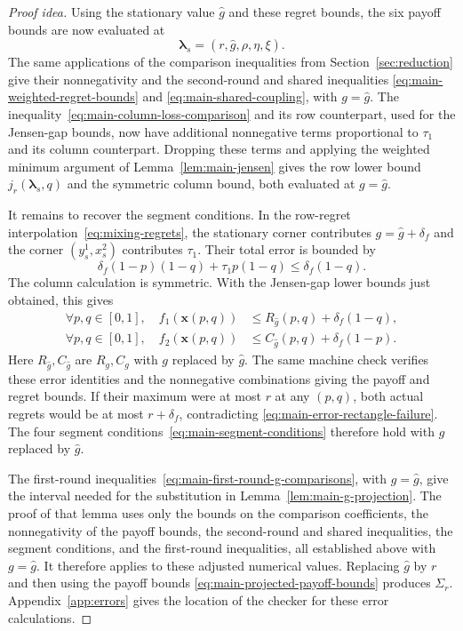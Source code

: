 \documentclass[11pt]{article}
\theoremstyle{remark}
\theoremstyle{plain}
\begin{document}
\begin{proof}[Proof idea]
Using the stationary value $\hat g$ and these regret bounds, the six
payoff bounds are now evaluated at
\begin{equation}
 \boldsymbol\lambda_s=(r,\hat g,\rho,\eta,\xi).
 \label{eq:main-error-payoff-parameters}
\end{equation}
The same applications of the comparison inequalities from
Section~\ref{sec:reduction}
give their nonnegativity and the second-round and shared inequalities
\eqref{eq:main-weighted-regret-bounds} and
\eqref{eq:main-shared-coupling}, with $g=\hat g$.
The inequality~\eqref{eq:main-column-loss-comparison} and its row
counterpart, used for the Jensen-gap bounds, now have
additional nonnegative terms proportional to $\tau_1$ and its
column counterpart. Dropping these terms and applying the weighted
minimum argument of Lemma~\ref{lem:main-jensen} gives the row
lower bound $j_r(\boldsymbol\lambda_s,q)$ and the symmetric
column bound, both evaluated at $g=\hat g$.

It remains to recover the segment conditions. In the row-regret
interpolation~\eqref{eq:mixing-regrets}, the stationary corner
contributes $g=\hat g+\delta_f$ and the corner $(y_s^1,x_s^2)$
contributes $\tau_1$. Their total error is bounded by
\[
 \delta_f(1-p)(1-q)+\tau_1p(1-q)
 \le\delta_f(1-q).
\]
The column calculation is symmetric. With the Jensen-gap lower
bounds just obtained, this gives
\begin{equation}
 \begin{aligned}
 \forall p,q\in[0,1],\quad f_1(\boldsymbol x(p,q))
   &\le R_{\hat g}(p,q)+\delta_f(1-q),\\
 \forall p,q\in[0,1],\quad f_2(\boldsymbol x(p,q))
   &\le C_{\hat g}(p,q)+\delta_f(1-p).
 \end{aligned}
 \label{eq:main-error-rectangle-bounds}
\end{equation}
Here $R_{\hat g},C_{\hat g}$ are $R_g,C_g$ with $g$ replaced by $\hat g$.
The same machine check verifies these error identities and
the nonnegative combinations giving the payoff and regret bounds.
If their maximum were at most $r$ at any $(p,q)$, both actual
regrets would be at most $r+\delta_f$, contradicting
\eqref{eq:main-error-rectangle-failure}.
The four segment conditions~\eqref{eq:main-segment-conditions}
therefore hold with $g$ replaced by $\hat g$.

The first-round inequalities~\eqref{eq:main-first-round-g-comparisons},
with $g=\hat g$, give the interval needed for the substitution in
Lemma~\ref{lem:main-g-projection}. The proof of that lemma uses
only the bounds on the comparison coefficients, the nonnegativity
of the payoff bounds, the second-round and shared inequalities, the
segment conditions, and the first-round inequalities, all
established above with $g=\hat g$. It therefore applies to these
adjusted numerical values. Replacing $\hat g$ by $r$ and then using the
payoff bounds
\eqref{eq:main-projected-payoff-bounds} produces $\Sigma_r$.
Appendix~\ref{app:errors} gives the location of the checker for these
error calculations.
\end{proof}
\end{document}
